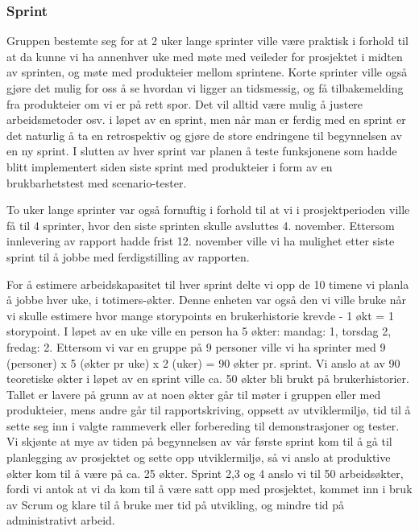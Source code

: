 \documentclass[12pt,a4paper,norsk]{article}
\begin{document}
	
	\subsubsection{Sprint}
	Gruppen bestemte seg for at 2 uker lange sprinter ville være praktisk i forhold til at da kunne vi ha annenhver uke med møte med veileder for prosjektet i midten av sprinten, og møte med produkteier mellom sprintene. Korte sprinter ville også gjøre det mulig for oss å se hvordan vi ligger an tidsmessig, og få tilbakemelding fra produkteier om vi er på rett spor. Det vil alltid være mulig å justere arbeidsmetoder osv. i løpet av en sprint, men når man er ferdig med en sprint er det naturlig å ta en retrospektiv og gjøre de store endringene til begynnelsen av en ny sprint. I slutten av hver sprint var planen å teste funksjonene som hadde blitt implementert siden siste sprint med produkteier i form av en brukbarhetstest med scenario-tester.

    To uker lange sprinter var også fornuftig i forhold til at vi i prosjektperioden ville få til 4 sprinter, hvor den siste sprinten skulle avsluttes 4. november. Ettersom innlevering av rapport hadde frist 12. november ville vi ha mulighet etter siste sprint til å jobbe med ferdigstilling av rapporten. 

    For å estimere arbeidskapasitet til hver sprint delte vi opp de 10 timene vi planla å jobbe hver uke, i totimers-økter. Denne enheten var også den vi ville bruke når vi skulle estimere hvor mange storypoints en brukerhistorie krevde - 1 økt = 1 storypoint. I løpet av en uke ville en person ha 5 økter: mandag: 1, torsdag 2, fredag: 2. Ettersom vi var en gruppe på 9 personer ville vi ha sprinter med 9 (personer) x 5 (økter pr uke) x 2 (uker) = 90 økter pr. sprint. Vi anslo at av 90 teoretiske økter i løpet av en sprint ville ca. 50 økter bli brukt på brukerhistorier. Tallet er lavere på grunn av at noen økter går til møter i gruppen eller med produkteier, mens andre går til rapportskriving, oppsett av utviklermiljø, tid til å sette seg inn i valgte rammeverk eller forbereding til demonstrasjoner og tester. Vi skjønte at mye av tiden på begynnelsen av vår første sprint kom til å gå til planlegging av prosjektet og sette opp utviklermiljø, så vi anslo at produktive økter kom til å være på ca. 25 økter. Sprint 2,3 og 4 anslo vi til 50 arbeidsøkter, fordi vi antok at vi da kom til å være satt opp med prosjektet, kommet inn i bruk av Scrum og klare til å bruke mer tid på utvikling, og mindre tid på administrativt arbeid.
\end{document}
